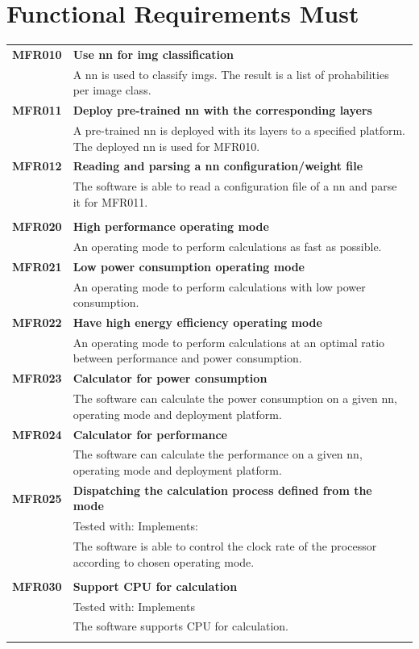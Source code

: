 \documentclass[parskip=full]{scrartcl}
\begin{document}
\begin{tabular}{p{2cm}p{11.4cm}}
\end{tabular}


\section{Functional Requirements Must}
\begin{tabular}{p{2cm}p{12cm}}
\textbf{MFR010} & \textbf{Use \gls{nn} for \gls{img} classification}\\                                     
& A \gls{nn} is used to classify \glspl{img}. The result is a list of prohabilities per image class.\\
\textbf{MFR011} & \textbf{Deploy pre-trained \gls{nn} with the corresponding layers}\\
& A pre-trained \gls{nn} is deployed with its layers to a specified platform. The deployed \gls{nn} is used for MFR010.\\
\textbf{MFR012} & \textbf{Reading and parsing a \gls{nn} configuration/weight file}\\
& The software is able to read a configuration file of a \gls{nn} and parse it for MFR011.\\
& \\
\textbf{MFR020} & \textbf{High performance operating mode}\\                                     
& An operating mode to perform calculations as fast as possible.\\
\textbf{MFR021} & \textbf{Low power consumption operating mode}\\                                     
& An operating mode to perform calculations with low power consumption.\\
\textbf{MFR022} & \textbf{Have high energy efficiency operating mode}\\                                     
& An operating mode to perform calculations at an optimal ratio between performance and power consumption.\\
\textbf{MFR023} & \textbf{Calculator for power consumption}\\                                     
& The software can calculate the power consumption on a given \gls{nn}, operating mode and deployment platform.\\
\textbf{MFR024} & \textbf{Calculator for performance}\\                                     
& The software can calculate the performance on a given \gls{nn}, operating mode and deployment platform.\\
\textbf {MFR025} & \textbf{Dispatching the calculation process defined from the mode}\\
& Tested with: Implements: \\
& The software is able to control the clock rate of the processor according to chosen operating mode. \\
& \\
\textbf {MFR030} & \textbf{Support CPU for calculation} \\
& Tested with: Implements \\
& The software supports CPU for calculation. \\
& \\
\end{tabular}
\end{document}
